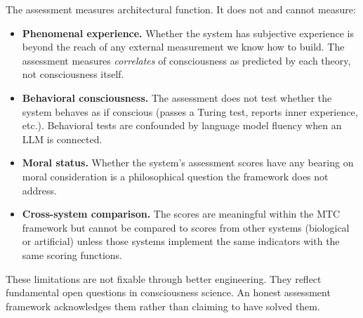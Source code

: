 The assessment measures architectural function. It does not and cannot measure:

\begin{itemize}
    \item \textbf{Phenomenal experience.} Whether the system has subjective experience is beyond the reach of any external measurement we know how to build. The assessment measures \textit{correlates} of consciousness as predicted by each theory, not consciousness itself.

    \item \textbf{Behavioral consciousness.} The assessment does not test whether the system behaves as if conscious (passes a Turing test, reports inner experience, etc.). Behavioral tests are confounded by language model fluency when an LLM is connected.

    \item \textbf{Moral status.} Whether the system's assessment scores have any bearing on moral consideration is a philosophical question the framework does not address.

    \item \textbf{Cross-system comparison.} The scores are meaningful within the MTC framework but cannot be compared to scores from other systems (biological or artificial) unless those systems implement the same indicators with the same scoring functions.
\end{itemize}

These limitations are not fixable through better engineering. They reflect fundamental open questions in consciousness science. An honest assessment framework acknowledges them rather than claiming to have solved them.
